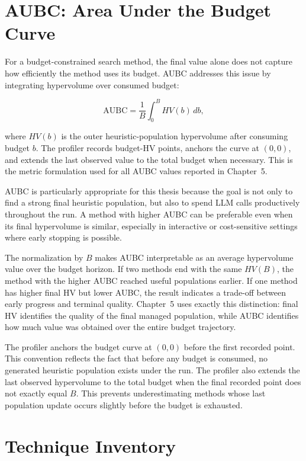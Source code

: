 \section{AUBC: Area Under the Budget Curve}

For a budget-constrained search method, the final value alone does not capture how efficiently the method uses its budget. AUBC addresses this issue by integrating hypervolume over consumed budget:

\begin{equation}
  \mathrm{AUBC}
  =
  \frac{1}{B}
  \int_{0}^{B} HV(b)\,db,
\end{equation}

where $HV(b)$ is the outer heuristic-population hypervolume after consuming budget $b$. The profiler records budget-HV points, anchors the curve at $(0,0)$, and extends the last observed value to the total budget when necessary. This is the metric formulation used for all AUBC values reported in Chapter~5.

AUBC is particularly appropriate for this thesis because the goal is not only to find a strong final heuristic population, but also to spend LLM calls productively throughout the run. A method with higher AUBC can be preferable even when its final hypervolume is similar, especially in interactive or cost-sensitive settings where early stopping is possible.

The normalization by $B$ makes AUBC interpretable as an average hypervolume value over the budget horizon. If two methods end with the same $HV(B)$, the method with the higher AUBC reached useful populations earlier. If one method has higher final HV but lower AUBC, the result indicates a trade-off between early progress and terminal quality. Chapter~5 uses exactly this distinction: final HV identifies the quality of the final managed population, while AUBC identifies how much value was obtained over the entire budget trajectory.

The profiler anchors the budget curve at $(0,0)$ before the first recorded point. This convention reflects the fact that before any budget is consumed, no generated heuristic population exists under the run. The profiler also extends the last observed hypervolume to the total budget when the final recorded point does not exactly equal $B$. This prevents underestimating methods whose last population update occurs slightly before the budget is exhausted.

\section{Technique Inventory}

